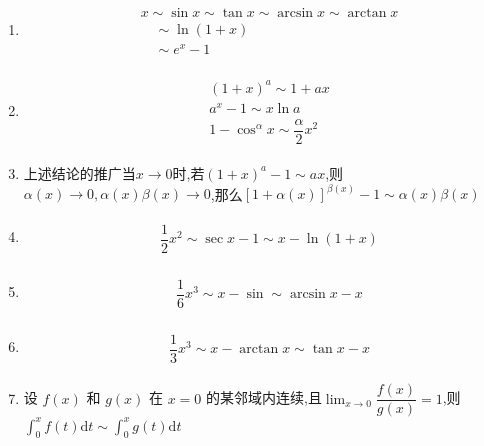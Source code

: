 \documentclass[12pt, a4paper, oneside, UTF8]{ctexbook}
\begin{document}
\begin{sloppypar}
\begin{enumerate}
        \item     \begin{align*} \boxed{\begin{aligned}& x \sim \sin x \sim \tan x \sim \arcsin x \sim \arctan x \nonumber \\& \quad  \sim \ln (1+x)  \nonumber                                  \\& \quad \sim e^x -1 \nonumber\end{aligned} }\end{align*}
        \item     \begin{align*} \boxed{\begin{aligned}& (1+x)^a \sim  1+ax   \\& a^x - 1 \sim x \ln a \\& 1- \cos^{\alpha} x \sim \dfrac{\alpha}{2}x^2\end{aligned}}\end{align*}
        \item     {上述结论的推广}{}当$x \to 0$时,若$(1+x)^a -1 \sim ax$,则$\alpha (x) \to 0,\alpha(x)\beta(x) \to 0$,那么$[1+\alpha(x)]^{\beta(x)} -1 \sim \alpha(x) \beta(x)$
        \item     \begin{align*} \boxed
            {
                \begin{aligned}
                     & \dfrac{1}{2} x^2  \sim \sec x -1 \sim x- \ln(1+x)
                \end{aligned}
            }
        \end{align*}
        \item     \begin{align*} \boxed
            {
                \begin{aligned}
                     & \dfrac{1}{6} x^3 \sim x-\sin \sim \arcsin x -x
                \end{aligned}
            }
        \end{align*}
        \item     \begin{align*} \boxed
            {
                \begin{aligned}
                     & \dfrac{1}{3} x^3 \sim x-\arctan x \sim \tan x-x
                \end{aligned}
            }
        \end{align*}
        \item  设 $f(x)$ 和 $g(x)$ 在 $x=0$ 的某邻域内连续,且$\operatorname*{lim}_{x\rightarrow0}\dfrac{f(x)}{g(x)}=1$,则$\int_{0}^{x}f(t)\mathrm{d}t\sim\int_{0}^{x}g(t)\mathrm{d}t$

\end{enumerate}
\end{sloppypar}
\end{document}
